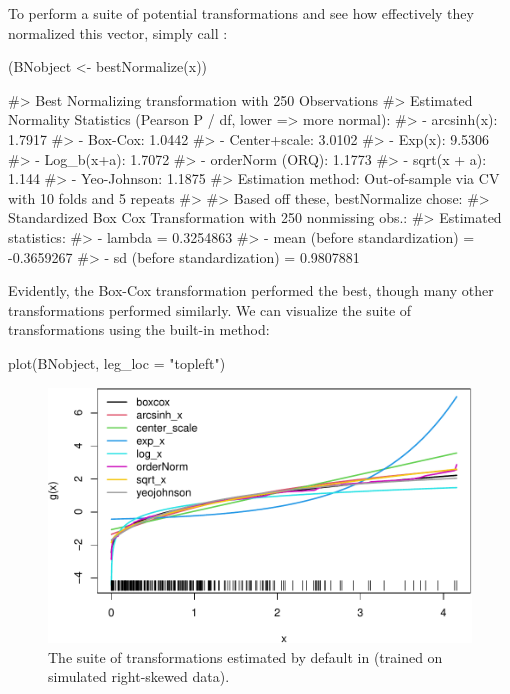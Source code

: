 To perform a suite of potential transformations and see how effectively
they normalized this vector, simply call :

\begin{Schunk}
\begin{Sinput}
(BNobject <- bestNormalize(x))
\end{Sinput}
\begin{Soutput}
#> Best Normalizing transformation with 250 Observations
#>  Estimated Normality Statistics (Pearson P / df, lower => more normal):
#>  - arcsinh(x): 1.7917
#>  - Box-Cox: 1.0442
#>  - Center+scale: 3.0102
#>  - Exp(x): 9.5306
#>  - Log_b(x+a): 1.7072
#>  - orderNorm (ORQ): 1.1773
#>  - sqrt(x + a): 1.144
#>  - Yeo-Johnson: 1.1875
#> Estimation method: Out-of-sample via CV with 10 folds and 5 repeats
#>  
#> Based off these, bestNormalize chose:
#> Standardized Box Cox Transformation with 250 nonmissing obs.:
#>  Estimated statistics:
#>  - lambda = 0.3254863 
#>  - mean (before standardization) = -0.3659267 
#>  - sd (before standardization) = 0.9807881
\end{Soutput}
\end{Schunk}

Evidently, the Box-Cox transformation performed the best, though many
other transformations performed similarly. We can visualize the suite of
transformations using the built-in  method:

\begin{Schunk}
\begin{Sinput}
plot(BNobject, leg_loc = "topleft")
\end{Sinput}
\begin{figure}

{\centering \includegraphics[width=1\linewidth]{figs/bnplot-1} 

}

\caption[The suite of transformations estimated by default in  (trained on simulated right-skewed data)]{The suite of transformations estimated by default in  (trained on simulated right-skewed data).}\label{fig:bnplot}
\end{figure}
\end{Schunk}

